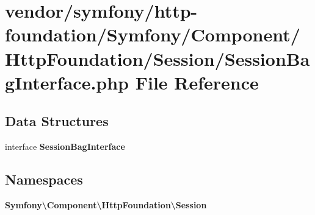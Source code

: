 \section{vendor/symfony/http-\/foundation/\+Symfony/\+Component/\+Http\+Foundation/\+Session/\+Session\+Bag\+Interface.php File Reference}
\label{_session_bag_interface_8php}
\subsection*{Data Structures}
\begin{DoxyCompactItemize}
\item 
interface {\bf Session\+Bag\+Interface}
\end{DoxyCompactItemize}
\subsection*{Namespaces}
\begin{DoxyCompactItemize}
\item 
 {\bf Symfony\textbackslash{}\+Component\textbackslash{}\+Http\+Foundation\textbackslash{}\+Session}
\end{DoxyCompactItemize}
